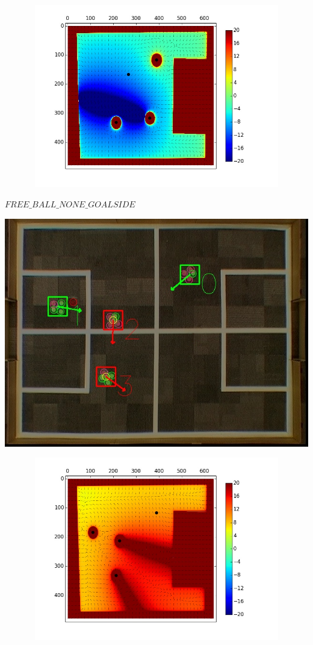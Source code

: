 \documentclass[a4paper,12pt]{article}
\begin{document}
\begin{minipage}{0.4\textwidth}
\includegraphics[height=80mm,width=135mm]{p2.jpg}
\end{minipage}\newline\newline
$FREE\_BALL\_NONE\_GOALSIDE$ \newline \newline
\begin{minipage}{0.4\textwidth}
\includegraphics[scale=0.3]{v4.jpg}
\end{minipage}
\begin{minipage}{0.4\textwidth}
\includegraphics[height=80mm,width=135mm]{p4.jpg}
\end{minipage}\newline\newline
\end{document}
